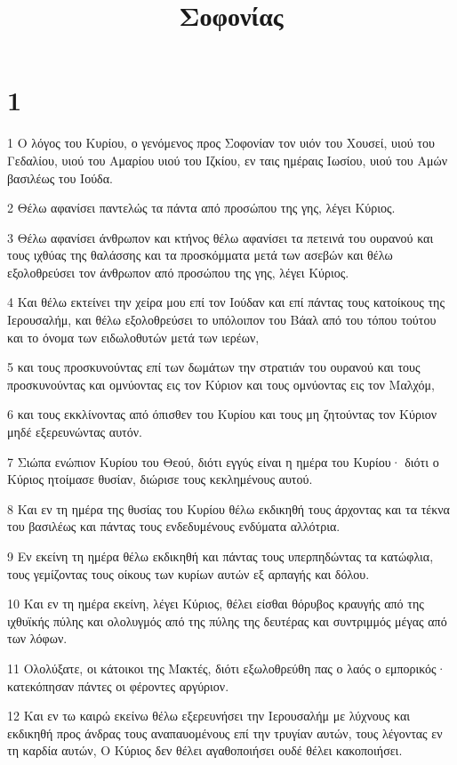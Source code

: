 

\title{Σοφονίας}


\chapter{1}

\par 1 Ο λόγος του Κυρίου, ο γενόμενος προς Σοφονίαν τον υιόν του Χουσεί, υιού του Γεδαλίου, υιού του Αμαρίου υιού του Ιζκίου, εν ταις ημέραις Ιωσίου, υιού του Αμών βασιλέως του Ιούδα.
\par 2 Θέλω αφανίσει παντελώς τα πάντα από προσώπου της γης, λέγει Κύριος.
\par 3 Θέλω αφανίσει άνθρωπον και κτήνος θέλω αφανίσει τα πετεινά του ουρανού και τους ιχθύας της θαλάσσης και τα προσκόμματα μετά των ασεβών και θέλω εξολοθρεύσει τον άνθρωπον από προσώπου της γης, λέγει Κύριος.
\par 4 Και θέλω εκτείνει την χείρα μου επί τον Ιούδαν και επί πάντας τους κατοίκους της Ιερουσαλήμ, και θέλω εξολοθρεύσει το υπόλοιπον του Βάαλ από του τόπου τούτου και το όνομα των ειδωλοθυτών μετά των ιερέων,
\par 5 και τους προσκυνούντας επί των δωμάτων την στρατιάν του ουρανού και τους προσκυνούντας και ομνύοντας εις τον Κύριον και τους ομνύοντας εις τον Μαλχόμ,
\par 6 και τους εκκλίνοντας από όπισθεν του Κυρίου και τους μη ζητούντας τον Κύριον μηδέ εξερευνώντας αυτόν.
\par 7 Σιώπα ενώπιον Κυρίου του Θεού, διότι εγγύς είναι η ημέρα του Κυρίου· διότι ο Κύριος ητοίμασε θυσίαν, διώρισε τους κεκλημένους αυτού.
\par 8 Και εν τη ημέρα της θυσίας του Κυρίου θέλω εκδικηθή τους άρχοντας και τα τέκνα του βασιλέως και πάντας τους ενδεδυμένους ενδύματα αλλότρια.
\par 9 Εν εκείνη τη ημέρα θέλω εκδικηθή και πάντας τους υπερπηδώντας τα κατώφλια, τους γεμίζοντας τους οίκους των κυρίων αυτών εξ αρπαγής και δόλου.
\par 10 Και εν τη ημέρα εκείνη, λέγει Κύριος, θέλει είσθαι θόρυβος κραυγής από της ιχθυϊκής πύλης και ολολυγμός από της πύλης της δευτέρας και συντριμμός μέγας από των λόφων.
\par 11 Ολολύξατε, οι κάτοικοι της Μακτές, διότι εξωλοθρεύθη πας ο λαός ο εμπορικός· κατεκόπησαν πάντες οι φέροντες αργύριον.
\par 12 Και εν τω καιρώ εκείνω θέλω εξερευνήσει την Ιερουσαλήμ με λύχνους και εκδικηθή προς άνδρας τους αναπαυομένους επί την τρυγίαν αυτών, τους λέγοντας εν τη καρδία αυτών, Ο Κύριος δεν θέλει αγαθοποιήσει ουδέ θέλει κακοποιήσει.
